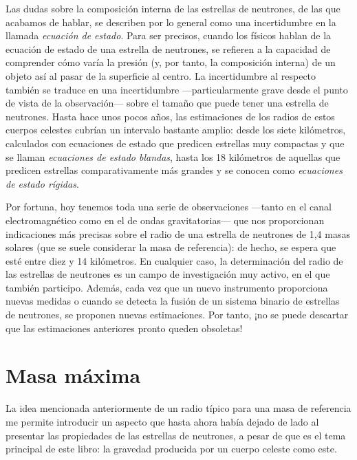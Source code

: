 Las dudas sobre la composición interna de las estrellas de neutrones, de las que acabamos de hablar, se describen por lo general como una incertidumbre en la llamada \emph{ecuación de estado}. Para ser precisos, cuando los físicos hablan de la ecuación de estado de una estrella de neutrones, se refieren a la capacidad de comprender cómo varía la presión (y, por tanto, la composición interna) de un objeto así al pasar de la superficie al centro. La incertidumbre al respecto también se traduce en una incertidumbre ---particularmente grave desde el punto de vista de la observación--- sobre el tamaño que puede tener una estrella de neutrones. Hasta hace unos pocos años, las estimaciones de los radios de estos cuerpos celestes cubrían un intervalo bastante amplio: desde los siete kilómetros, calculados con ecuaciones de estado que predicen estrellas muy compactas y que se llaman \emph{ecuaciones de estado blandas}, hasta los 18 kilómetros de aquellas que predicen estrellas comparativamente más grandes y se conocen como \emph{ecuaciones de estado rígidas}.

Por fortuna, hoy tenemos toda una serie de observaciones ---tanto en el canal electromagnético como en el de ondas gravitatorias--- que nos proporcionan indicaciones más precisas sobre el radio de una estrella de neutrones de 1,4 masas solares (que se suele considerar la masa de referencia): de hecho, se espera que esté entre diez y 14 kilómetros. En cualquier caso, la determinación del radio de las estrellas de neutrones es un campo de investigación muy activo, en el que también participo. Además, cada vez que un nuevo instrumento proporciona nuevas medidas o cuando se detecta la fusión de un sistema binario de estrellas de neutrones, se proponen nuevas estimaciones. Por tanto, ¡no se puede descartar que las estimaciones anteriores pronto queden obsoletas!

\section{Masa máxima}\label{sec:05-mass}

La idea mencionada anteriormente de un radio típico para una masa de referencia me permite introducir un aspecto que hasta ahora había dejado de lado al presentar las propiedades de las estrellas de neutrones, a pesar de que es el tema principal de este libro: la gravedad producida por un cuerpo celeste como este.

